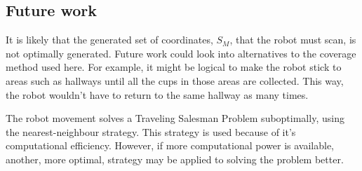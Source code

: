 \subsection{Future work}
\label{sec:planning_future}
It is likely that the generated set of coordinates, \(S_{M}\), that the robot must scan,
is not optimally generated. Future work could look into alternatives to the coverage method used here.
For example, it might be logical to make the robot stick to areas such as hallways until all the cups
in those areas are collected. This way, the robot wouldn't have to return to the same hallway as many times.

The robot movement solves a Traveling Salesman Problem suboptimally, using the nearest-neighbour strategy.
This strategy is used because of it's computational efficiency. However, if more computational power
is available, another, more optimal, strategy may be applied to solving the problem better.
